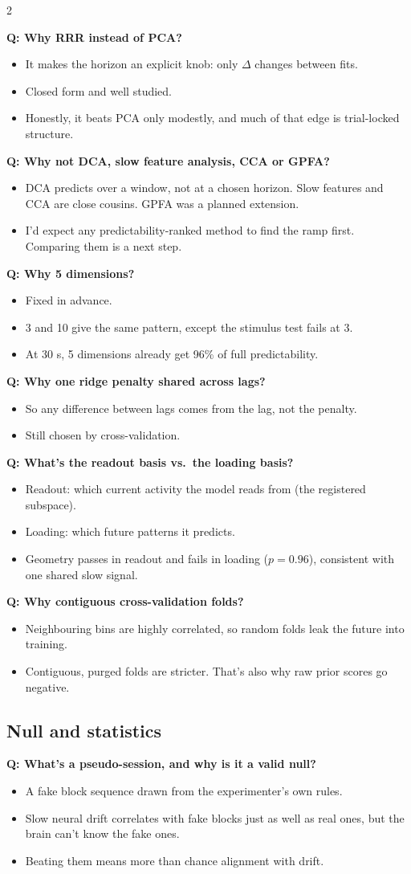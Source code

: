 \documentclass[10pt]{article}
\newcommand{\q}[2]{\par\smallskip\noindent\begin{minipage}{\linewidth}\raggedright{\bfseries\color{teal}Q: #1}\par\vspace{1pt}\begin{itemize}#2\end{itemize}\end{minipage}\par}
\begin{document}
\begin{multicols}{2}
\q{Why RRR instead of PCA?}{
\item It makes the horizon an explicit knob: only $\Delta$ changes between fits.
\item Closed form and well studied.
\item Honestly, it beats PCA only modestly, and much of that edge is trial-locked structure.}

\q{Why not DCA, slow feature analysis, CCA or GPFA?}{
\item DCA predicts over a window, not at a chosen horizon. Slow features and CCA are close cousins. GPFA was a planned
extension.
\item I'd expect any predictability-ranked method to find the ramp first. Comparing them is a next step.}

\q{Why 5 dimensions?}{
\item Fixed in advance.
\item 3 and 10 give the same pattern, except the stimulus test fails at 3.
\item At 30 s, 5 dimensions already get 96\% of full predictability.}

\q{Why one ridge penalty shared across lags?}{
\item So any difference between lags comes from the lag, not the penalty.
\item Still chosen by cross-validation.}

\q{What's the readout basis vs.\ the loading basis?}{
\item Readout: which current activity the model reads from (the registered subspace).
\item Loading: which future patterns it predicts.
\item Geometry passes in readout and fails in loading ($p = 0.96$), consistent with one shared slow signal.}

\q{Why contiguous cross-validation folds?}{
\item Neighbouring bins are highly correlated, so random folds leak the future into training.
\item Contiguous, purged folds are stricter. That's also why raw prior scores go negative.}

\subsection*{Null and statistics}

\q{What's a pseudo-session, and why is it a valid null?}{
\item A fake block sequence drawn from the experimenter's own rules.
\item Slow neural drift correlates with fake blocks just as well as real ones, but the brain can't know the fake ones.
\item Beating them means more than chance alignment with drift.}


\end{multicols}
\end{document}
